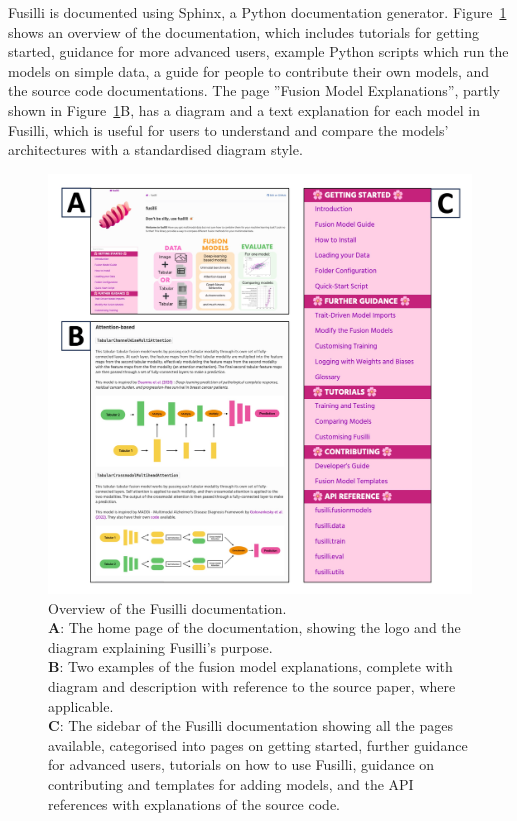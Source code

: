 Fusilli is documented using Sphinx, a Python documentation generator.
Figure~\ref{fig:fusillidocs} shows an overview of the documentation, which includes tutorials for getting started, guidance for more advanced users, example Python scripts which run the models on simple data, a guide for people to contribute their own models, and the source code documentations.
The page ''Fusion Model Explanations'', partly shown in Figure~\ref{fig:fusillidocs}B, has a diagram and a text explanation for each model in Fusilli, which is useful for users to understand and compare the models' architectures with a standardised diagram style.

\begin{figure}
    \centering
    \includegraphics[width=1\linewidth]{figures/fusilli_documentation}
    \caption[Overview of the Fusilli documentation.]{Overview of the Fusilli documentation. \\
    \textbf{A}: The home page of the documentation, showing the logo and the diagram explaining Fusilli's purpose.\\
    \textbf{B}: Two examples of the fusion model explanations, complete with diagram and description with reference to the source paper, where applicable. \\
    \textbf{C}: The sidebar of the Fusilli documentation showing all the pages available, categorised into pages on getting started, further guidance for advanced users, tutorials on how to use Fusilli, guidance on contributing and templates for adding models, and the API references with explanations of the source code.
    }
    \label{fig:fusillidocs}
\end{figure}

